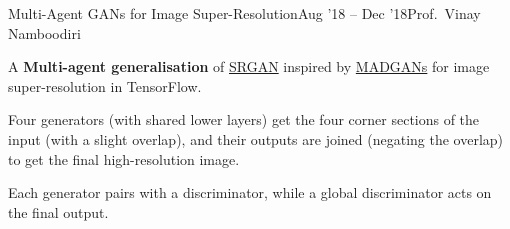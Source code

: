 \begin{itemize}
{    \item \begin{project}{Multi-Agent GANs for Image Super-Resolution}{Aug '18 -- Dec '18}{Prof.\ Vinay Namboodiri}%
        \item A \textbf{Multi-agent generalisation} of \href{https://arxiv.org/abs/1609.04802}{SRGAN} inspired by \href{http://openaccess.thecvf.com/content_cvpr_2018/papers_backup/Ghosh_Multi-Agent_Diverse_Generative_CVPR_2018_paper.pdf}{MADGANs} for image super-resolution in TensorFlow.
        \item Four generators (with shared lower layers) get the four corner sections of the input (with a slight overlap), and their outputs are joined (negating the overlap) to get the final high-resolution image.
        \item Each generator pairs with a discriminator, while a global discriminator acts on the final output.
    \end{project}
}

\item {}
\item {}%
\item {}%

\end{itemize}
